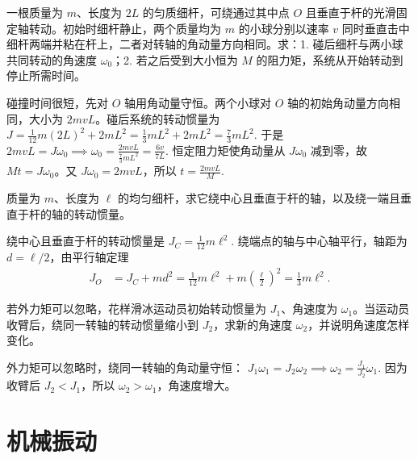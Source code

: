 \documentclass[lang=cn,11pt]{elegantbook}
\begin{document}
\begin{exercise}
一根质量为 \(m\)、长度为 \(2L\) 的匀质细杆，可绕通过其中点 \(O\) 且垂直于杆的光滑固定轴转动。初始时细杆静止，两个质量均为 \(m\) 的小球分别以速率 \(v\) 同时垂直击中细杆两端并粘在杆上，二者对转轴的角动量方向相同。求：1. 碰后细杆与两小球共同转动的角速度 \(\omega_0\)；2. 若之后受到大小恒为 \(M\) 的阻力矩，系统从开始转动到停止所需时间。
\end{exercise}

\begin{solution}
碰撞时间很短，先对 \(O\) 轴用角动量守恒。两个小球对 \(O\) 轴的初始角动量方向相同，大小为 \(2mvL\)。碰后系统的转动惯量为
 \(J=\frac{1}{12}m(2L)^2+2mL^2 =\frac13mL^2+2mL^2 =\frac73mL^2.\) 
于是
 \(2mvL=J\omega_0 \implies \omega_0=\frac{2mvL}{\frac73mL^2} =\frac{6v}{7L}.\) 
恒定阻力矩使角动量从 \(J\omega_0\) 减到零，故 \(Mt=J\omega_0\)。又 \(J\omega_0=2mvL\)，所以
 \(t=\frac{2mvL}{M}.\) 
\end{solution}

\begin{exercise}[均匀细杆绕中心轴和端点轴的转动惯量]
质量为 \(m\)、长度为 \(\ell\) 的均匀细杆，求它绕中心且垂直于杆的轴，以及绕一端且垂直于杆的轴的转动惯量。
\end{exercise}

\begin{solution}
绕中心且垂直于杆的转动惯量是
 \(J_C=\frac{1}{12}m\ell^2.\) 
绕端点的轴与中心轴平行，轴距为 \(d=\ell/2\)，由平行轴定理
\[
\begin{aligned}
J_O&=J_C+md^2
=\frac{1}{12}m\ell^2+m\left(\frac{\ell}{2}\right)^2
=\frac{1}{3}m\ell^2.
\end{aligned}
\]
\end{solution}

\begin{exercise}[花样滑冰收臂时角速度怎样变化]
若外力矩可以忽略，花样滑冰运动员初始转动惯量为 \(J_1\)、角速度为 \(\omega_1\)。当运动员收臂后，绕同一转轴的转动惯量缩小到 \(J_2\)，求新的角速度 \(\omega_2\)，并说明角速度怎样变化。
\end{exercise}

\begin{solution}
外力矩可以忽略时，绕同一转轴的角动量守恒：
 \(J_1\omega_1=J_2\omega_2 \implies \omega_2=\frac{J_1}{J_2}\omega_1.\) 
因为收臂后 \(J_2<J_1\)，所以 \(\omega_2>\omega_1\)，角速度增大。
\end{solution}

\chapter{机械振动}
\end{document}
